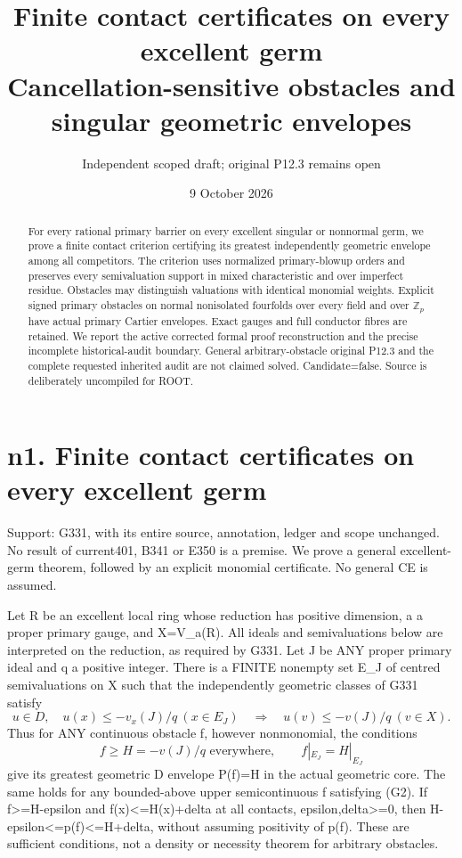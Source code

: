\documentclass[11pt]{article}
\title{Finite contact certificates on every excellent germ\\Cancellation-sensitive obstacles and singular geometric envelopes}
\author{Independent scoped draft; original P12.3 remains open}
\date{9 October 2026}
\begin{document}
\maketitle
\begin{abstract}
For every rational primary barrier on every excellent singular or nonnormal germ, we prove a finite contact criterion certifying its greatest independently geometric envelope among all competitors. The criterion uses normalized primary-blowup orders and preserves every semivaluation support in mixed characteristic and over imperfect residue. Obstacles may distinguish valuations with identical monomial weights. Explicit signed primary obstacles on normal nonisolated fourfolds over every field and over $\mathbb Z_p$ have actual primary Cartier envelopes. Exact gauges and full conductor fibres are retained. We report the active corrected formal proof reconstruction and the precise incomplete historical-audit boundary. General arbitrary-obstacle original P12.3 and the complete requested inherited audit are not claimed solved. Candidate=false. Source is deliberately uncompiled for ROOT.
\end{abstract}
\tableofcontents
\newpage
\section{n1. Finite contact certificates on every excellent germ}

Support: G331, with its entire source, annotation, ledger and scope unchanged. No result of current401, B341 or E350 is a premise. We prove a general excellent-germ theorem, followed by an explicit monomial certificate. No general CE is assumed.

Let R be an excellent local ring whose reduction has positive dimension, a a proper primary gauge, and X=V\_a(R). All ideals and semivaluations below are interpreted on the reduction, as required by G331. Let J be ANY proper primary ideal and q a positive integer. There is a FINITE nonempty set E\_J of centred semivaluations on X such that the independently geometric classes of G331 satisfy
\[
 u\in D,\quad u(x)\le -v_x(J)/q\ (x\in E_J)
 \quad\Longrightarrow\quad u(v)\le-v(J)/q\ (v\in X).       \tag{G1}
\]
Thus for ANY continuous obstacle f, however nonmonomial, the conditions
\[
 f\ge H=-v(J)/q\text{ everywhere},\qquad f|_{E_J}=H|_{E_J} \tag{G2}
\]
give its greatest geometric D envelope P(f)=H in the actual geometric core. The same holds for any bounded-above upper semicontinuous f satisfying (G2). If f>=H-epsilon and f(x)<=H(x)+delta at all contacts, epsilon,delta>=0, then H-epsilon<=p(f)<=H+delta, without assuming positivity of p(f). These are sufficient conditions, not a density or necessity theorem for arbitrary obstacles.
\end{document}
